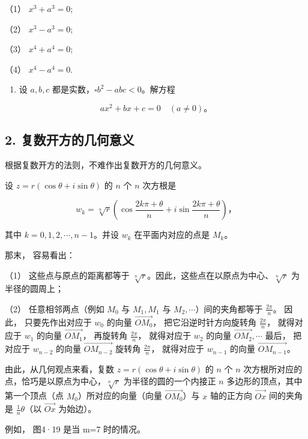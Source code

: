 （1） \(x^{3} + a^{3} = 0;\)

（2） \(x^{3} - a^{3} = 0;\)

（3） \(x^{4} + a^{4} = 0;\)

（4） \(x^{4} - a^{4} = 0.\)

\begin{enumerate}[start=5]
\item
  设 \(a, b, c\) 都是实数，\(\square b^2 - abc < 0\)。解方程
\end{enumerate}

\[
a x ^ {2} + b x + c = 0 \quad (a \neq 0)\text{。}
\]

\subsection{2. 复数开方的几何意义}

根据复数开方的法则，不难作出复数开方的几何意义。

设 \(z = r(\cos \theta + i\sin \theta)\) 的 \(n\) 个 \(n\) 次方根是

\[
w _ {k} = \sqrt [ n ]{r} \left(\cos \frac {2 k \pi + \theta}{n} + i \sin \frac {2 k \pi + \theta}{n}\right)\text{，}
\]

其中 \(k=0,1,2,\cdots,n-1\)。并设 \(w_{k}\) 在平面内对应的点是
\(M_{k}\)。

那末， 容易看出：

（1） 这些点与原点的距离都等于
\(\sqrt[n]{r}\)。因此，这些点在以原点为中心、\(\sqrt[n]{r}\)
为半径的圆周上；

（2） 任意相邻两点（例如 \(M_0\) 与 \(M_1, M_1\) 与
\(M_2, \cdots\)）间的夹角都等于 \(\frac{2\pi}{n}\)。 因此，
只要先作出对应于 \(w_0\) 的向量 \(\overrightarrow{OM_0}\)，
把它沿逆时针方向旋转角 \(\frac{2\pi}{n}\)， 就得对应于 \(w_1\) 的向量
\(\overrightarrow{OM_1}\)， 再旋转角 \(\frac{2\pi}{n}\)， 就得对应于
\(w_2\) 的向量 \(\overrightarrow{OM_2}, \cdots\) 最后， 把对应于
\(w_{n-2}\) 的向量 \(\overrightarrow{OM_{n-2}}\) 旋转角
\(\frac{2\pi}{n}\)， 就得对应于 \(w_{n-1}\) 的向量
\(\overrightarrow{OM_{n-1}}\)。

由此，从几何观点来看，复数 \(z = r(\cos \theta + i\sin \theta)\) 的
\(n\) 个 \(n\) 次方根所对应的点，恰巧是以原点为中心，\(\sqrt[n]{r}\)
为半径的圆的一个内接正 \(n\) 多边形的顶点，其中第一个顶点（点
\(M_0\)）所对应的向量（向量 \(\overrightarrow{OM_0}\)）与 \(x\)
轴的正方向 \(\overrightarrow{Ox}\) 间的夹角是 \(\frac{1}{n}\theta\)（以
\(\overrightarrow{Ox}\) 为始边）。

例如， 图4·19 是当 m=7 时的情况。

